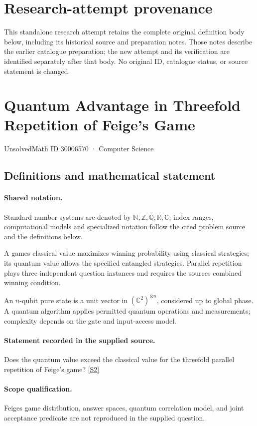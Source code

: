 \documentclass[11pt]{article}
\begin{document}
\section*{Research-attempt provenance}
This standalone research attempt retains the complete original definition body below,
including its historical source and preparation notes. Those notes describe the
earlier catalogue preparation; the new attempt and its verification are identified
separately after that body. No original ID, catalogue status, or source statement is changed.

\section{Quantum Advantage in Threefold Repetition of Feige’s Game}\label{30006570}
{\small UnsolvedMath ID 30006570 · Computer Science}
\subsection{Definitions and mathematical statement}

\paragraph{Shared notation.}Standard number systems are denoted by $\mathbb N,\mathbb Z,\mathbb Q,\mathbb R,\mathbb C$; index ranges, computational models and specialized notation follow the cited problem source and the definitions below.


A game\textquotesingle s classical value maximizes winning probability using classical strategies; its quantum value allows the specified entangled strategies. Parallel repetition plays three independent question instances and requires the source\textquotesingle s combined winning condition.

An $n$-qubit pure state is a unit vector in $(\mathbb C^2)^{\otimes n}$, considered up to global phase. A quantum algorithm applies permitted quantum operations and measurements; complexity depends on the gate and input-access model.
\paragraph{Statement recorded in the supplied source.}
Does the quantum value exceed the classical value for the threefold parallel repetition of Feige’s game? \href{https://doi.org/10.4171/owr/2026/4}{[S2]}
\paragraph{Scope qualification.}
Feige\textquotesingle s game distribution, answer spaces, quantum correlation model, and joint acceptance predicate are not reproduced in the supplied question.
\end{document}
